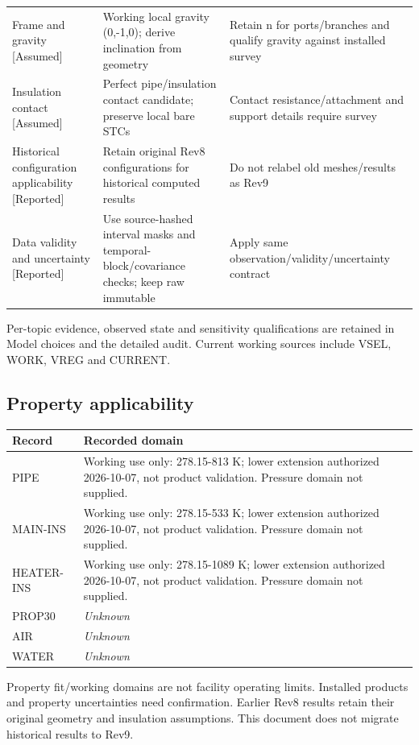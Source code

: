 \documentclass[11pt]{article}
\begin{document}
\begin{longtable}{>{\raggedright\arraybackslash}p{}>{\raggedright\arraybackslash}p{}>{\raggedright\arraybackslash}p{}}
Frame and gravity [Assumed] & Working local gravity (0,-1,0); derive inclination from geometry & Retain n for ports/branches and qualify gravity against installed survey\\[4pt]
Insulation contact [Assumed] & Perfect pipe/insulation contact candidate; preserve local bare STCs & Contact resistance/attachment and support details require survey\\[4pt]
Historical configuration applicability [Reported] & Retain original Rev8 configurations for historical computed results & Do not relabel old meshes/results as Rev9\\[4pt]
Data validity and uncertainty [Reported] & Use source-hashed interval masks and temporal-block/covariance checks; keep raw immutable & Apply same observation/validity/uncertainty contract\\[4pt]
\bottomrule\end{longtable}\endgroup
Per-topic evidence, observed state and sensitivity qualifications are retained in Model choices and the detailed audit. Current working sources include VSEL, WORK, VREG and CURRENT.
\clearpage\subsection*{Property applicability}
\begingroup\small\setlength{\tabcolsep}{4pt}
\begin{longtable}{>{\raggedright\arraybackslash}p{}>{\raggedright\arraybackslash}p{}}
\toprule
\textbf{Record} & \textbf{Recorded domain}\\\midrule\endhead
PIPE & Working use only: 278.15-813 K; lower extension authorized 2026-10-07, not product validation. Pressure domain not supplied.\\[4pt]
MAIN-INS & Working use only: 278.15-533 K; lower extension authorized 2026-10-07, not product validation. Pressure domain not supplied.\\[4pt]
HEATER-INS & Working use only: 278.15-1089 K; lower extension authorized 2026-10-07, not product validation. Pressure domain not supplied.\\[4pt]
PROP30 & \textit{Unknown}\\[4pt]
AIR & \textit{Unknown}\\[4pt]
WATER & \textit{Unknown}\\[4pt]
\bottomrule\end{longtable}\endgroup
Property fit/working domains are not facility operating limits. Installed products and property uncertainties need confirmation. Earlier Rev8 results retain their original geometry and insulation assumptions. This document does not migrate historical results to Rev9.
\end{document}
